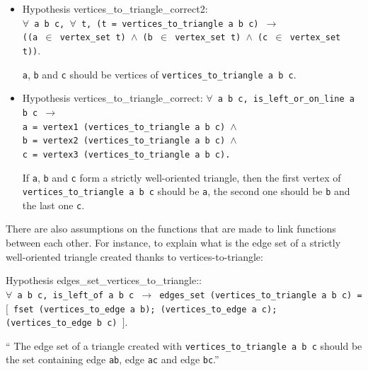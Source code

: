\documentclass[a4paper,10pt]{article}
\def\hypothesis#1#2{{\color{purple}Hypothesis} {\color{blue}#1}: {\tt #2}}
\begin{document}
\begin{itemize}
\item \hypothesis{vertices\_to\_triangle\_correct2}{\\$\forall$ a b c, $\forall$ t,
          (t = vertices\_to\_triangle a b c) $\rightarrow$\\
          ((a $\in$ vertex\_set t) $\wedge$ (b $\in$ vertex\_set t) $\wedge$ (c $\in$ vertex\_set t))}.
        
        {\tt a}, {\tt b} and {\tt c} should be vertices of {\tt vertices\_to\_triangle a b c}.


      \item \hypothesis{vertices\_to\_triangle\_correct}{$\forall$ a b c, 
    is\_left\_or\_on\_line a b c $\rightarrow$\\
    a = vertex1 (vertices\_to\_triangle a b c) $\wedge$\\
    b = vertex2 (vertices\_to\_triangle a b c) $\wedge$\\
    c = vertex3 (vertices\_to\_triangle a b c).}

  If {\tt a}, {\tt b} and {\tt c} form a strictly well-oriented triangle, then the first vertex of {\tt vertices\_to\_triangle a b c} should be {\tt a}, the second one should be {\tt b} and the last one {\tt c}.

        

\end{itemize}
There are also assumptions on the functions that are made to link functions between each other. For instance, to explain what is the edge set of a strictly well-oriented triangle created thanks to vertices-to-triangle:

\hypothesis{edges\_set\_vertices\_to\_triangle:}
  {\\$\forall$ a b c, is\_left\_of a b c $\rightarrow$
    edges\_set (vertices\_to\_triangle a b c) =\\ 
                       $[$ fset (vertices\_to\_edge a b);
                           (vertices\_to\_edge a c);
                           (vertices\_to\_edge b c) $]$}.
                         
`` The edge set of a triangle created with {\tt vertices\_to\_triangle a b c} should be the set containing edge {\tt ab}, edge {\tt ac} and edge {\tt bc}.''
                         
\end{document}
